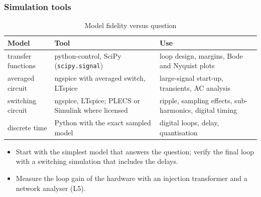 \begin{frame}
	\frametitle{Simulation tools}
	\begin{table}
		\centering
		\scriptsize
		\begin{tabular}{|l|>{\raggedright\arraybackslash}p{3.8cm}|>{\raggedright\arraybackslash}p{5.6cm}|}
			\hline
			\textbf{Model}           & \textbf{Tool}                                     & \textbf{Use}                                                     \\
			\hline
			transfer functions       & python-control, SciPy (\texttt{scipy.signal})     & loop design, margins, Bode and Nyquist plots                    \\
			averaged circuit         & ngspice with averaged switch, LTspice             & large-signal start-up, transients, AC analysis                  \\
			switching circuit        & ngspice, LTspice; PLECS or Simulink where licensed & ripple, sampling effects, sub-harmonics, digital timing         \\
			discrete time            & Python with the exact sampled model               & digital loops, delay, quantisation                              \\
			\hline
		\end{tabular}
		\caption{Model fidelity versus question}
	\end{table}
	\small
	\begin{itemize}
		\item Start with the simplest model that answers the question; verify the final loop with a switching simulation that includes the delays.
		\item Measure the loop gain of the hardware with an injection transformer and a network analyser (L5).
	\end{itemize}
\end{frame}

